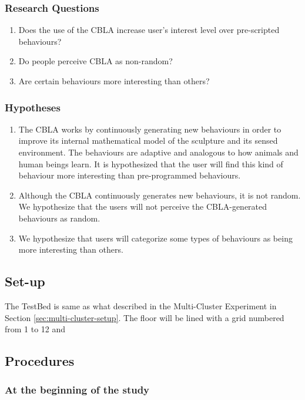 \subsubsection{Research Questions}
\begin{enumerate}
	\item Does the use of the CBLA increase user's interest level over pre-scripted behaviours?
	\item Do people perceive CBLA as non-random?
	\item Are certain behaviours  more interesting than others?
\end{enumerate}


\subsubsection{Hypotheses}
\begin{enumerate}
	\item The CBLA works by continuously generating new behaviours in order to improve its internal mathematical model of the sculpture and its sensed environment. The behaviours are adaptive and analogous to how animals and human beings learn. It is hypothesized that the user will find this kind of behaviour more interesting than pre-programmed behaviours.
	\item Although the CBLA continuously generates new behaviours, it is not random. We hypothesize that the users will not perceive the CBLA-generated behaviours as random. 
	\item We hypothesize that users will categorize some types of behaviours as being more interesting than others. 
\end{enumerate}

\subsection{Set-up}

The TestBed is same as what described in the Multi-Cluster Experiment in Section \ref{sec:multi-cluster-setup}. The floor will be lined with a grid numbered from 1 to 12 and 

\subsection{Procedures}

\subsubsection{At the beginning of the study}

